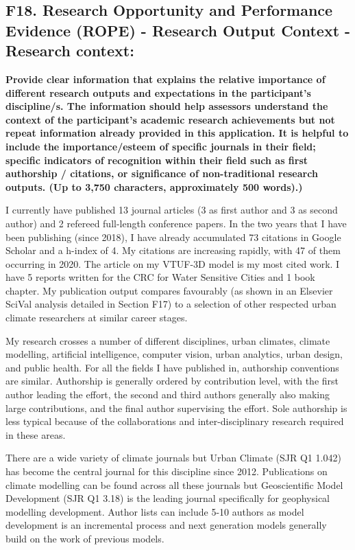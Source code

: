 \subsection*{\TitleFont F18. Research Opportunity and Performance Evidence (ROPE) - Research Output Context - Research context: }

\textbf{Provide clear information that explains the relative importance of different research outputs and expectations in the participant's discipline/s. The information should help assessors understand the context of the participant's academic research achievements but not repeat information already provided in this application. It is helpful to include the importance/esteem of specific journals in their field; specific indicators of recognition within their field such as first authorship / citations, or significance of non-traditional research outputs. (Up to 3,750 characters, approximately 500 words).)}




I currently have published 13 journal articles (3 as first author and 3 as second author) and 2 refereed full-length conference papers. In the two years that I have been publishing (since 2018), I have already accumulated 73 citations in Google Scholar and a h-index of 4. My citations are increasing rapidly, with 47 of them occurring in 2020. The article on my VTUF-3D model is my most cited work. I have 5 reports written for the CRC for Water Sensitive Cities and 1 book chapter. My publication output compares favourably (as shown in an Elsevier SciVal analysis detailed in Section F17) to a selection of other respected urban climate researchers at similar career stages. 

My research crosses a number of different disciplines, urban climates, climate modelling, artificial intelligence, computer vision, urban analytics, urban design, and public health. For all the fields I have published in, authorship conventions are similar. Authorship is generally ordered by contribution level, with the first author leading the effort, the second and third authors generally also making large contributions, and the final author supervising the effort. Sole authorship is less typical because of the collaborations and inter-disciplinary research required in these areas.

There are a wide variety of climate journals but Urban Climate (SJR Q1 1.042) has become the central journal for this discipline since 2012. Publications on climate modelling can be found across all these journals but Geoscientific Model Development (SJR Q1 3.18) is the leading journal specifically for geophysical modelling development. Author lists can include 5-10 authors as model development is an incremental process and next generation models generally build on the work of previous models.

